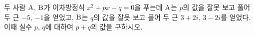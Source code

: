 두 사람 $\mathrm{A}$, $\mathrm{B}$가 이차방정식 $x^2+px+q=0$을 푸는데 $\mathrm{A}$는 $p$의 값을 잘못 보고 풀어 두 근 $-5$, $-1$을 얻었고, $\mathrm{B}$는 $q$의 값을 잘못 보고 풀어 두 근 $3+2i$, $3-2i$를 얻었다. 이때 실수 $p$, $q$에 대하여 $p+q$의 값을 구하시오.

